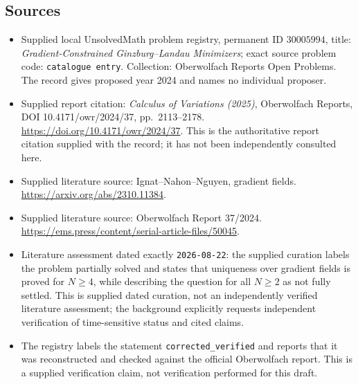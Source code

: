 \documentclass[11pt]{article}
\begin{document}
\subsection{Sources}
\begin{itemize}
\item Supplied local UnsolvedMath problem registry, permanent ID \(30005994\), title: \emph{Gradient-Constrained Ginzburg--Landau Minimizers}; exact source problem code: \texttt{catalogue entry}. Collection: Oberwolfach Reports Open Problems. The record gives proposed year 2024 and names no individual proposer.
\item Supplied report citation: \emph{Calculus of Variations (2025)}, Oberwolfach Reports, DOI 10.4171/owr/2024/37, pp.\ 2113--2178. \url{https://doi.org/10.4171/owr/2024/37}. This is the authoritative report citation supplied with the record; it has not been independently consulted here.
\item Supplied literature source: Ignat--Nahon--Nguyen, gradient fields. \url{https://arxiv.org/abs/2310.11384}.
\item Supplied literature source: Oberwolfach Report 37/2024. \url{https://ems.press/content/serial-article-files/50045}.
\item Literature assessment dated exactly \texttt{2026-08-22}: the supplied curation labels the problem partially solved and states that uniqueness over gradient fields is proved for \(N\geq4\), while describing the question for all \(N\geq2\) as not fully settled. This is supplied dated curation, not an independently verified literature assessment; the background explicitly requests independent verification of time-sensitive status and cited claims.
\item The registry labels the statement \texttt{corrected\_verified} and reports that it was reconstructed and checked against the official Oberwolfach report. This is a supplied verification claim, not verification performed for this draft.
\end{itemize}
\end{document}
